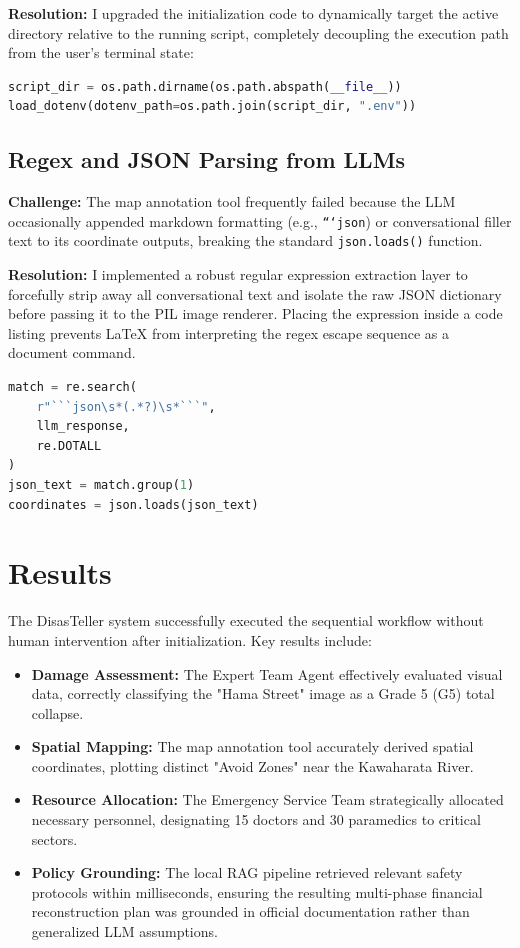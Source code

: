 \documentclass[conference,twocolumn,twoside]{IEEEtran}
\begin{document}
\textbf{Resolution:} I upgraded the initialization code to dynamically target the active directory relative to the running script, completely decoupling the execution path from the user's terminal state:
\begin{lstlisting}[language=Python, caption={Dynamic Environment Pathing}]
script_dir = os.path.dirname(os.path.abspath(__file__))
load_dotenv(dotenv_path=os.path.join(script_dir, ".env"))
\end{lstlisting}

\subsection{Regex and JSON Parsing from LLMs}
\textbf{Challenge:} The map annotation tool frequently failed because the LLM occasionally appended markdown formatting (e.g., \texttt{```json}) or conversational filler text to its coordinate outputs, breaking the standard \texttt{json.loads()} function.

\textbf{Resolution:} I implemented a robust regular expression extraction layer to forcefully strip away all conversational text and isolate the raw JSON dictionary before passing it to the PIL image renderer. Placing the expression inside a code listing prevents LaTeX from interpreting the regex escape sequence as a document command.

\begin{lstlisting}[language=Python, caption={JSON extraction from an LLM response.}]
match = re.search(
    r"```json\s*(.*?)\s*```",
    llm_response,
    re.DOTALL
)
json_text = match.group(1)
coordinates = json.loads(json_text)
\end{lstlisting}

\section{Results}
The DisasTeller system successfully executed the sequential workflow without human intervention after initialization. Key results include:
\begin{itemize}
    \item \textbf{Damage Assessment:} The Expert Team Agent effectively evaluated visual data, correctly classifying the "Hama Street" image as a Grade 5 (G5) total collapse.
    \item \textbf{Spatial Mapping:} The map annotation tool accurately derived spatial coordinates, plotting distinct "Avoid Zones" near the Kawaharata River.
    \item \textbf{Resource Allocation:} The Emergency Service Team strategically allocated necessary personnel, designating 15 doctors and 30 paramedics to critical sectors.
    \item \textbf{Policy Grounding:} The local RAG pipeline retrieved relevant safety protocols within milliseconds, ensuring the resulting multi-phase financial reconstruction plan was grounded in official documentation rather than generalized LLM assumptions.
\end{itemize}
\end{document}
